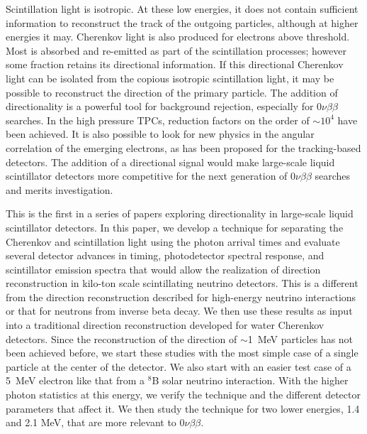 \documentclass[cits]{JINST}
\begin{document}
Scintillation light is isotropic. At these low energies, it does not contain sufficient information to reconstruct the track of the outgoing particles, although at higher energies it may\cite{john}.  Cherenkov light is also
produced for electrons above threshold. Most is absorbed and re-emitted as part of the
scintillation processes; however some fraction retains its
directional information. If this directional Cherenkov light can be
isolated from the copious isotropic scintillation light, it may be
possible to reconstruct the direction of the primary particle. The addition of directionality is a powerful tool
for background rejection, especially for $0\nu\beta\beta$ searches. In the high pressure TPCs, reduction factors on the order of $\sim10^4$ have been achieved\cite{Gotthard}. It is also possible to look for new physics in the angular correlation of the emerging electrons\cite{newphysics0nuBB}, as has been proposed for the tracking-based detectors\cite{SuperNEMO,NEXTsipm}. The addition of a directional signal would make large-scale liquid scintillator detectors more competitive for the next generation of $0\nu\beta\beta$ searches and merits investigation.

This is the first in a series of papers exploring directionality in large-scale liquid scintillator detectors. In this paper, we develop a technique for
separating the Cherenkov and scintillation light using the photon arrival
times and evaluate several detector advances in timing, photodetector 
spectral response, and scintillator emission spectra that would allow
the realization of direction reconstruction in kilo-ton scale
scintillating neutrino detectors. This is a different from the direction reconstruction described for high-energy neutrino interactions\cite{john} or that for neutrons from inverse beta decay\cite{chooz,dcDirection}.  We then use these results as input into a traditional direction reconstruction developed for water Cherenkov detectors. Since the reconstruction of the direction of $\sim$1~MeV particles has not been achieved before, we start these studies with the most simple case of a single particle at the center of the detector. We also start with an easier test case of a 5~MeV electron like that from a $^{8}$B solar neutrino interaction. With the higher photon statistics at this energy, we verify the technique and the different detector parameters that affect it. We then study the technique for two lower energies, 1.4 and 2.1 MeV, that are more relevant to $0\nu\beta\beta$.  
\end{document}
